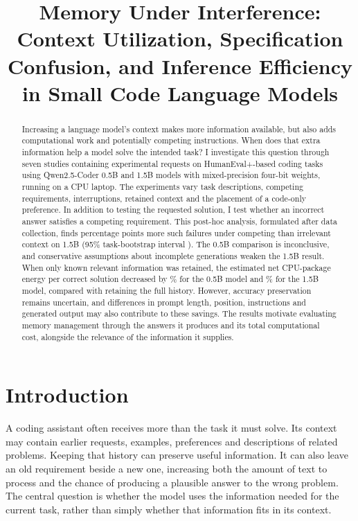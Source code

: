 \documentclass[10pt,a4paper,twocolumn]{article}
\title{\vspace{-1cm}Memory Under Interference:\\Context Utilization, Specification Confusion, and Inference Efficiency in Small Code Language Models}
\author{}
\date{}
\begin{document}
\RaggedRight
\raggedbottom
\maketitle
\begin{abstract}
\RaggedRight
Increasing a language model's context makes more information available, but also
adds computational work and potentially competing instructions. When does that
extra information help a model solve the intended task? I investigate this
question through seven studies containing \MainRequests{} experimental requests
on HumanEval+-based coding tasks using Qwen2.5-Coder 0.5B and 1.5B models
with mixed-precision four-bit weights, running on a CPU laptop.
The experiments vary task descriptions, competing requirements, interruptions,
retained context and the placement of a code-only preference. In addition to
testing the requested solution, I test whether an incorrect answer satisfies a
competing requirement. This post-hoc analysis, formulated after data collection, finds \LargeCross{} percentage
points more such failures under competing than irrelevant context on 1.5B
(95\% task-bootstrap interval \LargeCrossCI{}). The 0.5B comparison is
inconclusive, and conservative assumptions about incomplete generations weaken
the 1.5B result. When only known relevant information was retained, the estimated net
CPU-package energy per correct solution decreased by \SmallEnergyReduction\%
for the 0.5B model and \LargeEnergyReduction\% for the 1.5B model, compared with
retaining the full history. However, accuracy preservation remains uncertain,
and differences in prompt length, position, instructions and generated output
may also contribute to these savings. The results motivate evaluating memory
management through the answers it produces and its total computational cost,
alongside the relevance of the information it supplies.
\end{abstract}

\section{Introduction}
A coding assistant often receives more than the task it must solve. Its context
may contain earlier requests, examples, preferences and descriptions of related
problems. Keeping that history can preserve useful information. It can also
leave an old requirement beside a new one, increasing both the amount of text
to process and the chance of producing a plausible answer to the wrong problem.
The central question is whether the model uses the information needed for the
current task, rather than simply whether that information fits in its context.
\end{document}
